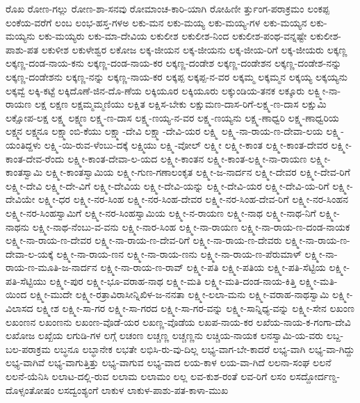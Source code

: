 ರೊಖ
ರೋಣ-ಗಲ್ಲು
ರೋಣ-ಶಾ-ಸನವು
ರೋಮಾಂಚ-ಕಾರಿ-ಯಾಗಿ
ರೋಹಿಣೀ
ರ್ತ್ತುಂಗ-ಪರಾಕ್ರಮಂ
ಲಂಕಪ್ಪ
ಲಂಕೆಯ-ವರೆಗೆ
ಲಂಬ
ಲಂಭ-ಹಸ್ತ-ಗಳಅ
ಲಕು-ಮನ
ಲಕು-ಮಯ್ಯ
ಲಕು-ಮಯ್ಯ-ಗಳ
ಲಕು-ಮಯ್ಯನ
ಲಕು-ಮಯ್ಯನು
ಲಕು-ಮಯ್ಯರು
ಲಕು-ಮಾ-ದೇವಿಯ
ಲಕುಲೀಶ
ಲಕುಲೀಶ-ನಿಂದ
ಲಕುಲೀಶ-ಪಂಥ-ವನ್ನಷ್ಟೇ
ಲಕುಲೀಶ-ಪಾಶು-ಪತ
ಲಕುಳೀಶ
ಲಕುಳೇಶ್ವರ
ಲಕೋಜ
ಲಕ್ಕ-ಜೀಯನ
ಲಕ್ಕ-ಜೀಯನು
ಲಕ್ಕ-ಜೀಯ-ರಿಗೆ
ಲಕ್ಕ-ಜೀಯರು
ಲಕ್ಕಣ್ಣ
ಲಕ್ಕಣ್ಣ-ದಂಡ-ನಾಯ-ಕನು
ಲಕ್ಕಣ್ಣ-ದಂಡ-ನಾಯ-ಕರ
ಲಕ್ಕಣ್ಣ-ದಂಡೇಶ
ಲಕ್ಕಣ್ಣ-ದಂಡೇಶನ
ಲಕ್ಕಣ್ಣ-ದಂಡೇಶ-ನನ್ನು
ಲಕ್ಕಣ್ಣ-ದಂಡೇಶನು
ಲಕ್ಕಣ್ಣ-ನನ್ನು
ಲಕ್ಕಣ್ಣ-ನಾಯ-ಕರ
ಲಕ್ಕಪ್ಪ
ಲಕ್ಕಪ್ಪ-ನ-ವರ
ಲಕ್ಕಮ್ಮ
ಲಕ್ಕಮ್ಮನ
ಲಕ್ಕಯ್ಯ
ಲಕ್ಕಯ್ಯನು
ಲಕ್ಕವ್ವೆ
ಲಕ್ಕಿ-ಕಟ್ಟೆ
ಲಕ್ಕಿದೊಣೆ-ಜಿನ-ದೊ-ಣೆಯ
ಲಕ್ಕಿಯೂರ
ಲಕ್ಕಿಯೂರು
ಲಕ್ಕುಂಡಿಯ-ತನಕ
ಲಕ್ಕೂರು
ಲಕ್ವ್ಮೀ-ನಾ-ರಾಯಣ
ಲಕ್ಷ
ಲಕ್ಷಣ
ಲಕ್ಷಮ್ಮಮ್ಮಣಿಯು
ಲಕ್ಷಿತ
ಲಕ್ಷಿಸ-ಬೇಕು
ಲಕ್ಷುಮಣ-ದಾಸ-ರಿಗೆ-ಲಕ್ಷ್ಮ-ಣ-ದಾಸ
ಲಕ್ಷುಮಿ
ಲಕ್ಷೋಪ-ಲಕ್ಷ
ಲಕ್ಷ್ಮ
ಲಕ್ಷ್ಮಣ
ಲಕ್ಷ್ಮ-ಣ-ದಾಸ
ಲಕ್ಷ್ಮ-ಣಯ್ಯ-ನ-ವರ
ಲಕ್ಷ್ಮ-ಣಯ್ಯನು
ಲಕ್ಷ್ಮ-ಣಾಧ್ವರಿ
ಲಕ್ಷ್ಮ-ಣಾಧ್ವರಿಯ
ಲಕ್ಷ್ಮನ
ಲಕ್ಷ್ಮನೂ
ಲಕ್ಷ್ಮಾಂಬಿ-ಕೆಯು
ಲಕ್ಷ್ಮಾ-ದೇವಿ
ಲಕ್ಷ್ಮಾ-ದೇವಿ-ಯರ
ಲಕ್ಷ್ಮಿ
ಲಕ್ಷ್ಮಿ-ನಾ-ರಾಯ-ಣ-ದೇವಾ-ಲಯ
ಲಕ್ಷ್ಮಿ-ಯಂತಿದ್ದಳು
ಲಕ್ಷ್ಮಿ-ಯಿ-ರುವ-ಳೆಂಬು-ದಕ್ಕೆ
ಲಕ್ಷ್ಮಿಯು
ಲಕ್ಷ್ಮಿ-ವೋಲ್
ಲಕ್ಷ್ಮೀ
ಲಕ್ಷ್ಮೀ-ಕಾಂತ
ಲಕ್ಷ್ಮೀ-ಕಾಂತ-ದೇವರ
ಲಕ್ಷ್ಮೀ-ಕಾಂತ-ದೇವ-ರೆಂದು
ಲಕ್ಷ್ಮೀ-ಕಾಂತ-ದೇವಾ-ಲ-ಯದ
ಲಕ್ಷ್ಮೀ-ಕಾಂತನ
ಲಕ್ಷ್ಮೀ-ಕಾಂತ-ಲಕ್ಷ್ಮೀ-ನಾ-ರಾಯಣ
ಲಕ್ಷ್ಮೀ-ಕಾಂತಸ್ವಾಮಿ
ಲಕ್ಷ್ಮೀ-ಕಾಂತಸ್ವಾಮಿಯ
ಲಕ್ಷ್ಮೀ-ಗುಣ-ಗಣಾಲಂಕೃತ
ಲಕ್ಷ್ಮೀ-ಜ-ನಾರ್ದನ
ಲಕ್ಷ್ಮೀ-ದೇವರ
ಲಕ್ಷ್ಮೀ-ದೇವ-ರಿಗೆ
ಲಕ್ಷ್ಮೀ-ದೇವಿ
ಲಕ್ಷ್ಮೀ-ದೇ-ವಿಗೆ
ಲಕ್ಷ್ಮೀ-ದೇವಿಯ
ಲಕ್ಷ್ಮೀ-ದೇವಿ-ಯನ್ನು
ಲಕ್ಷ್ಮೀ-ದೇವಿ-ಯರ
ಲಕ್ಷ್ಮೀ-ದೇವಿ-ಯ-ರಿಗೆ
ಲಕ್ಷ್ಮೀ-ದೇವಿಯೇ
ಲಕ್ಷ್ಮೀ-ಧರ
ಲಕ್ಷ್ಮೀ-ನರ-ಸಿಂಹ
ಲಕ್ಷ್ಮೀ-ನರ-ಸಿಂಹ-ದೇವರ
ಲಕ್ಷ್ಮೀ-ನರ-ಸಿಂಹ-ದೇವ-ರಿಗೆ
ಲಕ್ಷ್ಮೀ-ನರ-ಸಿಂಹನ
ಲಕ್ಷ್ಮೀ-ನರ-ಸಿಂಹಸ್ವಾಮಿಗೆ
ಲಕ್ಷ್ಮೀ-ನರ-ಸಿಂಹಸ್ವಾಮಿಯ
ಲಕ್ಷ್ಮೀ-ನ-ರಾಯಣ
ಲಕ್ಷ್ಮೀ-ನಾಥ
ಲಕ್ಷ್ಮೀ-ನಾಥ-ನಿಗೆ
ಲಕ್ಷ್ಮೀ-ನಾಥನು
ಲಕ್ಷ್ಮೀ-ನಾಥ-ನೆಂಬು-ವ-ವನು
ಲಕ್ಷ್ಮೀ-ನಾರ-ಸಿಂಹ
ಲಕ್ಷ್ಮೀ-ನಾ-ರಾಯಣ
ಲಕ್ಷ್ಮೀ-ನಾ-ರಾಯ-ಣ-ದಂಡ-ನಾಯಕ
ಲಕ್ಷ್ಮೀ-ನಾ-ರಾಯ-ಣ-ದೇವರ
ಲಕ್ಷ್ಮೀ-ನಾ-ರಾಯ-ಣ-ದೇವ-ರಿಗೆ
ಲಕ್ಷ್ಮೀ-ನಾ-ರಾಯ-ಣ-ದೇವರು
ಲಕ್ಷ್ಮೀ-ನಾ-ರಾಯ-ಣ-ದೇವಾ-ಲ-ಯಕ್ಕೆ
ಲಕ್ಷ್ಮೀ-ನಾ-ರಾಯ-ಣನ
ಲಕ್ಷ್ಮೀ-ನಾ-ರಾಯ-ಣನು
ಲಕ್ಷ್ಮೀ-ನಾ-ರಾಯ-ಣ-ಪೆರುಮಾಳ್
ಲಕ್ಷ್ಮೀ-ನಾ-ರಾಯ-ಣ-ಮೂತಿ-ಜ-ನಾರ್ದನ
ಲಕ್ಷ್ಮೀ-ನಾ-ರಾಯ-ಣ-ರಾವ್
ಲಕ್ಷ್ಮೀ-ಪತಿ
ಲಕ್ಷ್ಮೀ-ಪತಿಯ
ಲಕ್ಷ್ಮೀ-ಪತಿ-ಸೆಟ್ಟಿಯ
ಲಕ್ಷ್ಮೀ-ಪತಿ-ಸೆಟ್ಟಿಯು
ಲಕ್ಷ್ಮೀ-ಪುರ
ಲಕ್ಷ್ಮೀ-ಭೂ-ವರಾಹ-ನಾಥ
ಲಕ್ಷ್ಮೀ-ಮತಿ
ಲಕ್ಷ್ಮೀ-ಮತಿ-ದಂಡ-ನಾಯ-ಕಿತ್ತಿ
ಲಕ್ಷ್ಮೀ-ಮತಿ-ಯಿಂದ
ಲಕ್ಷ್ಮೀ-ಮುದೇ
ಲಕ್ಷ್ಮೀ-ರತ್ರಾವಿರಾಸೀನ್ನಿಖಿಳ-ಜ-ನನತಾ
ಲಕ್ಷ್ಮೀ-ಲಲಾ-ಮನು
ಲಕ್ಷ್ಮೀ-ವರಾಹ-ನಾಥಸ್ವಾಮಿ
ಲಕ್ಷ್ಮೀ-ವಿಲಾಸದ
ಲಕ್ಷ್ಮೀಶ
ಲಕ್ಷ್ಮೀ-ಸಾ-ಗರ
ಲಕ್ಷ್ಮೀ-ಸಾ-ಗರದ
ಲಕ್ಷ್ಮೀ-ಸಾ-ಗರ-ವನ್ನು
ಲಕ್ಷ್ಮೀ-ಸಾನ್ನಿಧ್ಯ-ವನ್ನು
ಲಕ್ಷ್ಮೀ-ಸೇನ
ಲಖಂಣ
ಲಖಂಣನ
ಲಖಂಣನು
ಲಖಂಣ-ವೊಡೆ-ಯರ
ಲಖಣ್ಣ-ವೊಡೆಯ
ಲಖಪ-ನಾಯ-ಕರ
ಲಖೆಯ-ನಾಯ-ಕ-ಗಂಗಾ-ದೇವಿ
ಲಖೋಜ
ಲಖ್ಖೆಯ
ಲಗುಡಿ-ಗಳ
ಲಗ್ಗೆ
ಲಚಂಣ
ಲಚ್ಚಣ್ಣ
ಲಚ್ಚಣ್ಣನು
ಲಚ್ಚಿಯ-ನಾಯಕ
ಲನಸ್ವಾಮಿ-ಯ-ವರು
ಲಬ್ದ-ಬಲ-ಪರಾಕ್ರಮ
ಲಬ್ಧನೂ
ಲಬ್ಧಾನೇಕ
ಲಭತೇ
ಲಭಿಸಿ-ರು-ವು-ದಿಲ್ಲ
ಲಭ್ಯ-ವಾಗ-ಬೇ-ಕಾದರೆ
ಲಭ್ಯ-ವಾಗಿ
ಲಭ್ಯ-ವಾ-ಗಿದ್ದು
ಲಭ್ಯ-ವಾಗಿವೆ
ಲಭ್ಯ-ವಾಗುತ್ತಿತ್ತು
ಲಭ್ಯ-ವಾಗುವ
ಲಭ್ಯ-ವಾದ
ಲಯ-ಕಾಳ
ಲಯ-ವಾ-ಗಿದೆ
ಲಲನಾ-ಸಂಘ
ಲಲನೆ
ಲಲನೆ-ಯೆನಿಸಿ
ಲಲಾಟ-ದಲ್ಲಿ-ರುವ
ಲಲಾಮ
ಲಲಾಮಂ
ಲಲ್ಲ
ಲವ-ಕುಶ-ರಂತೆ
ಲವ-ರಿಗೆ
ಲಸಂ
ಲಸದ್ದೋರ್ದಣ್ಡ-ದೊಳ್ಸಂತೋಷಂ
ಲಸದ್ವಂಶ್ಯಂಗೆ
ಲಾಕುಳ
ಲಾಕುಳ-ಪಾಶು-ಪತ-ಕಾಳಾ-ಮುಖ
